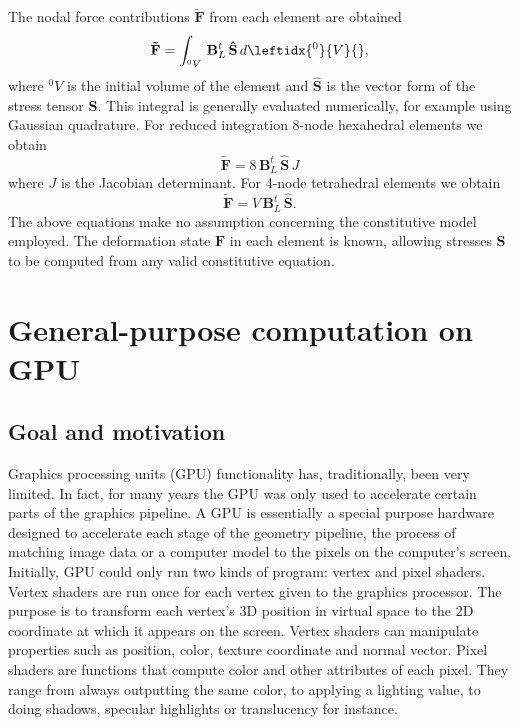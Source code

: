 \bigskip

\noindent The nodal force contributions $ \mathbf{\tilde{F}} $ from each element are obtained 
\begin{equation}
\mathbf{\tilde{F}} = \int_{^0 V} \, \mathbf{B}_L^t \, \mathbf{\hat{S}} \, d\leftidx{^0}{ V }{},
\end{equation}
where $ ^0 V $ is the initial volume of the element and $ \mathbf{\hat{S}} $ is the vector form of the stress tensor $ \mathbf{S} $. This integral is generally evaluated numerically, for example using Gaussian quadrature. For reduced integration 8-node hexahedral elements we obtain
\begin{equation}
\mathbf{\tilde{F}} = 8 \, \mathbf{B}_L^t \, \mathbf{\hat{S}} \, J
\end{equation}
where $ J $ is the Jacobian determinant. For 4-node tetrahedral elements we obtain
\begin{equation}
\mathbf{\tilde{F}} = V \, \mathbf{B}_L^t \, \mathbf{\hat{S}}.
\end{equation}
The above equations make no assumption concerning the constitutive model employed. The deformation state $ \mathbf{F} $ in each element is known, allowing stresses $ \mathbf{S} $ to be computed from any valid constitutive equation. 


\section{General-purpose computation on GPU}

	\subsection{Goal and motivation}
Graphics processing units (GPU) functionality has, traditionally, been very limited. In fact, for many years the GPU was only used to accelerate certain parts of the graphics pipeline. A GPU is essentially a special purpose hardware designed to accelerate each stage of the geometry pipeline, the process of matching image data or a computer model to the pixels on the computer's screen. Initially, GPU could only run two kinds of program: vertex and pixel shaders. Vertex shaders are run once for each vertex given to the graphics processor. The purpose is to transform each vertex's 3D position in virtual space to the 2D coordinate at which it appears on the screen. Vertex shaders can manipulate properties such as position, color, texture coordinate and normal vector. Pixel shaders are functions that compute color and other attributes of each pixel. They range from always outputting the same color, to applying a lighting value, to doing shadows, specular highlights or translucency for instance.


